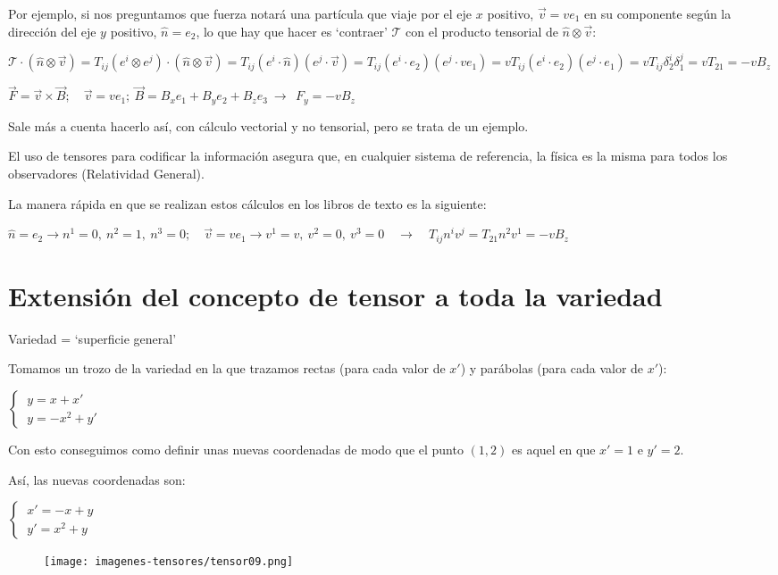 Por ejemplo, si nos preguntamos que fuerza notará una partícula que viaje por el eje $x$ positivo, $\vec v=ve_1$ en su componente según la dirección del eje $y$ positivo, $\hat n=e_2$, lo que hay que hacer es `contraer' $\mathcal T$ con el producto tensorial de $\hat n \otimes \vec v$:

$\mathcal T \cdot (\hat n \otimes \vec v)=T_{ij}(e^i\otimes e^j) \cdot (\hat n \otimes \vec v) = T_{ij} (e^i \cdot \hat n)(e^j \cdot \vec v)= T_{ij} (e^i \cdot e_2)(e^j \cdot  v e_1)=vT_{ij}(e^i\cdot e_2)(e^j\cdot e_1)=vT_{ij}\delta^i_2 \delta^j_1=vT_{21}=-vB_z$

\textcolor{gris}{$\overrightarrow F=\vec v \times \overrightarrow B;\quad \vec v=ve_1; \ \overrightarrow B=B_xe_1+B_ye_2+B_ze_3 \ \to \ \  F_y=-vB_z$}

\textcolor{gris}{Sale más a cuenta hacerlo así, con cálculo vectorial y no tensorial, pero se trata de un ejemplo.}

El uso de tensores para codificar la información asegura que, en cualquier sistema de referencia, la física es la misma para todos los observadores (Relatividad General).

La manera rápida en que se realizan estos cálculos en los libros de texto es la siguiente:

$\hat n=e_2 \to n^1=0, \ n^2=1, \ n^3=0; \quad
\vec v=ve_1 \to v^1=v, \ v^2=0, \ v^3=0 \quad \to \quad
T_{ij}n^iv^j=T_{21}n^2v^1=-vB_z$

\section{Extensión del concepto de tensor a toda la variedad}

\begin{multicols}{2}
\textcolor{gris}{Variedad = `superficie general'}

Tomamos un trozo de la variedad en la que trazamos rectas (para cada valor de $x'$) y parábolas (para cada valor de $x'$):

$\begin{cases}
\ y=x+x' \\ \ y=-x^2+y' 	
\end{cases}$

Con esto conseguimos como definir unas nuevas coordenadas de modo que el punto $(1,2)$ es aquel en que $x'=1 \text{ e } y'=2$.

Así, las nuevas coordenadas son:

$\begin{cases}
\ x'=-x+y \\ \ y'=x^2+y 	
\end{cases}$

\begin{figure}[H]
		\centering
		\texttt{[image: imagenes-tensores/tensor09.png]}
	\end{figure}	
\end{multicols}

